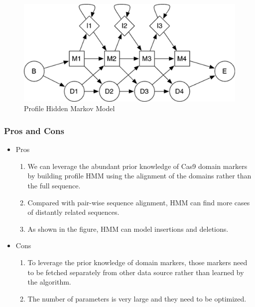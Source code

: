 \documentclass[11pt, oneside]{article}
\begin{document}
\begin{figure}[ht]
  \centering
  \includegraphics[scale = 0.7]{images/profileHMM}
      \caption{Profile Hidden Markov Model\cite{hmmer}}
      \label{HMM}
\end{figure}


\subsubsection{Pros and Cons}
\begin{itemize}
\item Pros
\begin{enumerate}
\item We can leverage the abundant prior knowledge of Cas9 domain markers by building profile HMM using the alignment of the domains rather than the full sequence.
\item Compared with pair-wise sequence alignment, HMM can find more cases of distantly related sequences.
\item As shown in the figure, HMM can model insertions and deletions.
\end{enumerate}
\item Cons
\begin{enumerate}
\item To leverage the prior knowledge of domain markers, those markers need to be fetched separately from other data source rather than learned by the algorithm.
\item The number of parameters is very large and they need to be optimized.
\end{enumerate}
\end{itemize}
\end{document}
